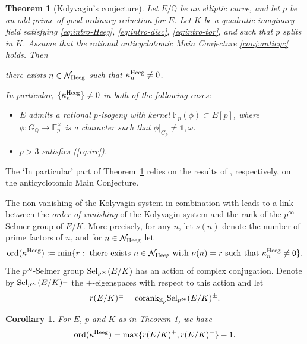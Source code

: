 \documentclass[10pt,reqno]{amsart}
\numberwithin{equation}{section}
\theoremstyle{plain}
\theoremstyle{definition}
\theoremstyle{definition}
\theoremstyle{plain}
\theoremstyle{plain}
\theoremstyle{plain}
\theoremstyle{plain}
\theoremstyle{plain}
\newtheorem{thmintro}{Theorem}
\theoremstyle{plain}
\newtheorem{corintro}{Corollary}
\DeclareMathOperator{\ord}{ord}
\newcommand{\Z}{\mathbb{Z}}
\newcommand{\Q}{\mathbb{Q}}
\begin{document}
\begin{thmintro}[Kolyvagin's conjecture]\label{thmintroKoly}
Let $E/\Q$ be an elliptic curve, and let $p$ be an odd prime of good ordinary reduction for $E$. Let $K$ be a quadratic imaginary field satisfying \eqref{eq:intro-Heeg}, \eqref{eq:intro-disc}, \eqref{eq:intro-tor}, and such that $p$ splits in $K$. Assume that the rational anticyclotomic Main Conjecture \ref{conj:anticyc} holds.
 Then 
\begin{center}
there exists $n\in\mathcal{N}_{\rm Heeg}$ such that $\kappa_{n}^{\rm Heeg}\neq 0$. 
\end{center}
In particular, 
$\{\kappa_{n}^{\rm Heeg}\}\neq 0$ in both of the following cases:
\begin{itemize}
\item[$\circ$] $E$ admits a rational $p$-isogeny with kernel $\mathbb{F}_p(\phi)\subset E[p]$, where $\phi:G_\Q \to \mathbb{F}_p^{\times}$ is a character such that $\phi|_{G_p}\neq\mathds{1},\omega$. 
\item[$\circ$] $p>3$ satisfies {\rm (\ref{eq:irr})}.
\end{itemize}
\end{thmintro}


The `In particular' part 
of Theorem~\ref{thmintroKoly}
relies on the results of \cite{eisenstein_cyc,bcs}, respectively, on 
the anticyclotomic Main Conjecture.

The non-vanishing of the Kolyvagin system in 
 combination with \cite[Theorem 4]{kolystructure} 
 leads to a link between the \emph{order of vanishing} of the Kolyvagin system and the rank of the $p^{\infty}$-Selmer group of $E/K$. More precisely, for any $n$, let $\nu(n)$ denote the number of prime factors of $n$, and 
for $n\in\mathcal{N}_{\rm Heeg}$ 
let
\[
\ord(\kappa^{\rm Heeg}):= \min \{r: \text{ there exists }n\in \mathcal{N}_{\rm Heeg} \text{ with } \nu(n)=r \text{ such that }\kappa_n^{\rm Heeg}\neq 0\}.
\]
 The $p^\infty$-Selmer group ${\rm Sel}_{p^{\infty}}(E/K)$ 
  has an action of complex conjugation. Denote by ${\rm Sel}_{p^{\infty}}(E/K)^\pm$ the $\pm$-eigenspaces with respect to this action and let 
$$r(E/K)^{\pm}= {\rm corank}_{\Z_p}{\rm Sel}_{p^{\infty}}(E/K)^\pm.$$
\begin{corintro}\label{corA}
For $E$, $p$ and $K$ as in Theorem \ref{thmintroKoly}, we have
\[
\ord(\kappa^{\rm Heeg})= \max\{r(E/K)^+,r(E/K)^-\} -1.
\]
\end{corintro}
\end{document}
